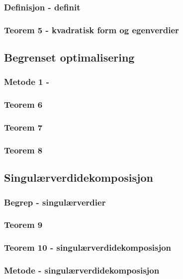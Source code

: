 \documentclass{article}
\begin{document}
      \subsubsection{Definisjon - definit}
        
      \subsubsection{Teorem 5 - kvadratisk form og egenverdier}
        
    \subsection{Begrenset optimalisering}
      \subsubsection{Metode 1 - }
        
      \subsubsection{Teorem 6}
        
      \subsubsection{Teorem 7}
        
      \subsubsection{Teorem 8}
        
    \subsection{Singulærverdidekomposisjon}
      \subsubsection{Begrep - singulærverdier}
        
      \subsubsection{Teorem 9}
        
      \subsubsection{Teorem 10 - singulærverdidekomposisjon}
        
      \subsubsection{Metode - singulærverdidekomposisjon}
        
\end{document}
